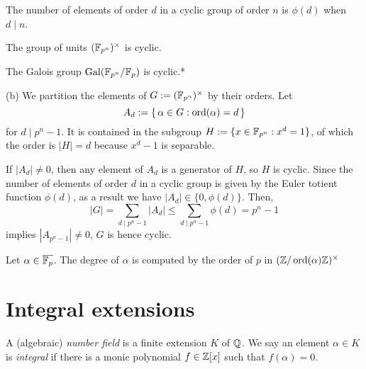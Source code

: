 \documentclass{../../large}
\begin{document}
\begin{prb}
\begin{parts}
\item The number of elements of order $d$ in a cyclic group of order $n$ is $\phi(d)$ when $d\mid n$.
\item The group of units $(\mathbb{F}_{p^n})^\times$ is cyclic.
\item The Galois group $\operatorname{Gal}(\mathbb{F}_{p^n}/\mathbb{F}_p)$ is cyclic.*
\end{parts}
\end{prb}
\begin{pf}
(b)
We partition the elements of $G:=(\mathbb{F}_{p^n})^\times$ by their orders.
Let
\[A_d:=\{\,\alpha\in G:\operatorname{ord}(\alpha)=d\,\}\]
for $d\mid p^n-1$.
It is contained in the subgroup $H:=\{x\in\mathbb{F}_{p^n}:x^d=1\}$, of which the order is $|H|=d$ because $x^d-1$ is separable.

If $|A_d|\ne0$, then any element of $A_d$ is a generator of $H$, so $H$ is cyclic.
Since the number of elements of order $d$ in a cyclic group is given by the Euler totient function $\phi(d)$, as a result we have $|A_d|\in\{0,\phi(d)\}$.
Then,
\[|G|=\sum_{d\mid p^n-1}|A_d|\le\sum_{d\mid p^n-1}\phi(d)=p^n-1\]
implies $|A_{p^n-1}|\ne0$, $G$ is hence cyclic.
\end{pf}

\begin{prb}
Let $\alpha\in\overline{\mathbb{F}_p}$.
The degree of $\alpha$ is computed by the order of $p$ in $(\mathbb{Z}/\operatorname{ord}(\alpha)\mathbb{Z})^\times$
\end{prb}


\section{Integral extensions}

\begin{prb}
A (algebraic) \emph{number field} is a finite extension $K$ of $\mathbb{Q}$.
We say an element $\alpha\in K$ is \emph{integral} if there is a monic polynomial $f\in\mathbb{Z}[x]$ such that $f(\alpha)=0$.
\end{prb}
\end{document}
